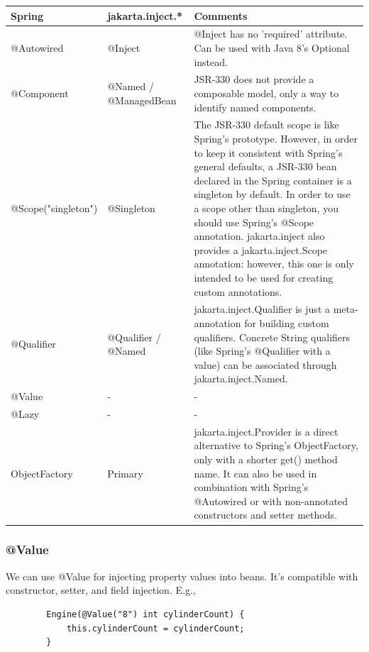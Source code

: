 \documentclass{scrartcl}
\begin{document}
\begin{table}[hbt!]
\begin{tabular}{ p{.25\linewidth}  p{.15\linewidth}  p{.5\linewidth}}
    \hline
    Spring&  jakarta.inject.*&  Comments\\
    \hline
    @Autowired & @Inject & @Inject has no 'required' attribute. Can be used with Java 8's Optional instead.\\
    \hline
    @Component&  @Named / @ManagedBean&  JSR-330 does not provide a composable model, only a way to identify named components.\\
    \hline
    @Scope("singleton")&  @Singleton&  The JSR-330 default scope is like     Spring’s prototype. However, in order to keep it consistent with
    Spring’s general defaults, a JSR-330 bean declared in the Spring
    container is a singleton by default. In order to use a scope
    other than singleton, you should use Spring’s @Scope
    annotation. jakarta.inject also provides a jakarta.inject.Scope    annotation: however, this one is only intended to be used for
    creating custom annotations.\\
    \hline
    @Qualifier&  @Qualifier / @Named&  jakarta.inject.Qualifier is just a meta-annotation for building custom qualifiers. Concrete
    String qualifiers (like Spring’s @Qualifier with a value) can be
    associated through jakarta.inject.Named.\\
    \hline
    @Value&  -&  -\\
    \hline
    @Lazy&  -&  -\\
    \hline
    ObjectFactory&  Primary&  jakarta.inject.Provider is a  direct alternative to Spring’s ObjectFactory, only with a
    shorter get() method name. It can also be used in combination
    with Spring’s @Autowired or with non-annotated constructors and
    setter methods.\\
    \hline
\end{tabular}
\end{table}

\subsubsection{@Value}

    We can use @Value for injecting property values into beans. It’s compatible with constructor, setter, and field injection. E.g.,

    \begin{lstlisting}
        Engine(@Value("8") int cylinderCount) {
            this.cylinderCount = cylinderCount;
        }
    \end{lstlisting}
\end{document}
